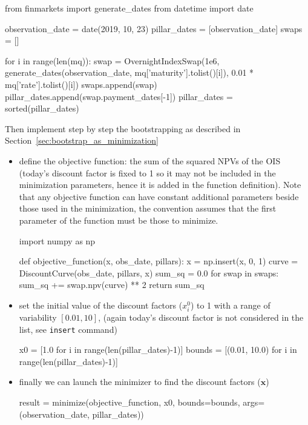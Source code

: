\begin{ipython}
from finmarkets import generate_dates
from datetime import date

observation_date = date(2019, 10, 23)
pillar_dates = [observation_date]
swaps = []

for i in range(len(mq)):
    swap = OvernightIndexSwap(1e6,
             generate_dates(observation_date,
                            mq['maturity'].tolist()[i]),
             0.01 * mq['rate'].tolist()[i])
    swaps.append(swap)
	pillar_dates.append(swap.payment_dates[-1])
pillar_dates = sorted(pillar_dates)
\end{ipython}

Then implement step by step the bootstrapping as described in Section~\ref{sec:bootstrap_as_minimization}

\begin{itemize}
\tightlist
\item
  define the objective function: the sum of the squared NPVs of the OIS (today's discount factor is fixed to 1 so it may not be included in the minimization parameters, hence it is added in the function definition). Note that any objective function can have constant additional parameters beside those used in the minimization, the convention assumes that the first parameter of the function must be those to minimize. 

\begin{ipython}
import numpy as np

def objective_function(x, obs_date, pillars):
    x = np.insert(x, 0, 1)
    curve = DiscountCurve(obs_date, pillars, x)
    sum_sq = 0.0
    for swap in swaps:
        sum_sq += swap.npv(curve) ** 2
    return sum_sq
\end{ipython}

\item
  set the initial value of the discount factors (\(x_i^0\)) to 1 with a
  range of variability \([ 0.01, 10]\), (again today's discount factor is not considered 
  in the list, see \texttt{insert} command)

\begin{ipython}
x0 = [1.0 for i in range(len(pillar_dates)-1)]
bounds = [(0.01, 10.0) for i in range(len(pillar_dates)-1)]
\end{ipython}

\item
  finally we can launch the minimizer to find the discount factors
  (\(\mathbf{x}\))

\begin{ipython}
result = minimize(objective_function, x0, bounds=bounds,
                  args=(observation_date, pillar_dates))


\end{ipython}
\end{itemize}
